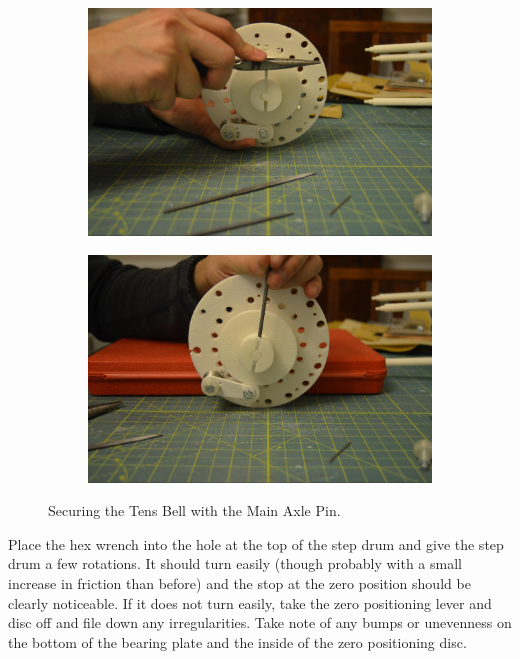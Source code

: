 \documentclass[openany]{book}
\begin{document}
\begin{figure}[!ht]
	\centering
	\begin{subfigure}{.45\textwidth}
		\centering
		\includegraphics[width=.9\textwidth]{images/image18.jpg}
		\label{fig:image18}	
	\end{subfigure}
	\begin{subfigure}{.45\textwidth}
		\centering
		\includegraphics[width=.9\textwidth]{images/image3.jpg}
		\label{fig:image3}	
	\end{subfigure}
	\caption{Securing the Tens Bell with the Main Axle Pin.}
	\label{fig:mainaxlepin}
\end{figure}


Place the hex wrench into the hole at the top of the step drum and give the step drum a few rotations. It should turn easily (though probably with a small increase in friction than before) and the stop at the zero position should be clearly noticeable. If it does not turn easily, take the zero positioning lever and disc off and file down any irregularities. Take note of any bumps or unevenness on the bottom of the bearing plate and the inside of the zero positioning disc.
\end{document}
